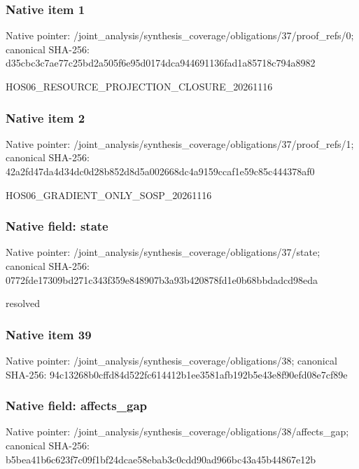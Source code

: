 \documentclass[10pt,a4paper]{article}
\begin{document}
\subsubsection{Native item 1}
Native pointer: /joint\_\allowbreak{}analysis/synthesis\_\allowbreak{}coverage/obligations/37/proof\_\allowbreak{}refs/0; canonical SHA-256: d35cbc3c7ae77c25bd2a505f6e95d0174dca944691136fad1a85718c794a8982

\begingroup\raggedright\sloppy HOS06\_\allowbreak{}RESOURCE\_\allowbreak{}PROJECTION\_\allowbreak{}CLOSURE\_\allowbreak{}20261116\par\endgroup

\subsubsection{Native item 2}
Native pointer: /joint\_\allowbreak{}analysis/synthesis\_\allowbreak{}coverage/obligations/37/proof\_\allowbreak{}refs/1; canonical SHA-256: 42a2fd47da4d34dc0d28b852d8d5a002668dc4a9159ccaf1e59c85c444378af0

\begingroup\raggedright\sloppy HOS06\_\allowbreak{}GRADIENT\_\allowbreak{}ONLY\_\allowbreak{}SOSP\_\allowbreak{}20261116\par\endgroup

\subsubsection{Native field: state}
Native pointer: /joint\_\allowbreak{}analysis/synthesis\_\allowbreak{}coverage/obligations/37/state; canonical SHA-256: 0772fde17309bd271c343f359e848907b3a93b420878fd1e0b68bbdadcd98eda

\begingroup\raggedright\sloppy resolved\par\endgroup

\subsubsection{Native item 39}
Native pointer: /joint\_\allowbreak{}analysis/synthesis\_\allowbreak{}coverage/obligations/38; canonical SHA-256: 94c13268b0cffd84d522fc614412b1ee3581afb192b5e43e8f90efd08e7cf89e

\subsubsection{Native field: affects\_\allowbreak{}gap}
Native pointer: /joint\_\allowbreak{}analysis/synthesis\_\allowbreak{}coverage/obligations/38/affects\_\allowbreak{}gap; canonical SHA-256: b5bea41b6c623f7c09f1bf24dcae58ebab3c0cdd90ad966bc43a45b44867e12b
\end{document}
